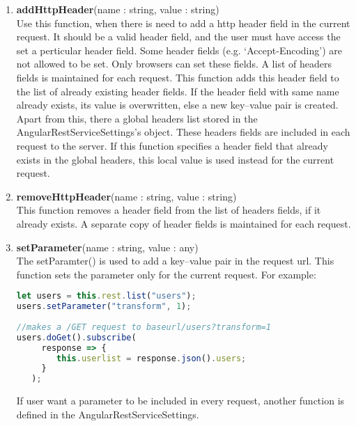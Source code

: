 \begin{enumerate}
{}
\item{ \textbf{addHttpHeader}(name : string, value : string) \\
	Use this function, when there is need to add a http header field in the current request. It should be a valid header field, and the user must have access the set a perticular header field. Some header fields (e.g.  `Accept-Encoding') are not allowed to be set. Only browsers can set these fields. A list of headers fields is maintained for each request. This function adds this header field to the list of already existing header fields. If the header field with same name already exists, its value is overwritten, else a new key--value pair is created. Apart from this, there a global headers list stored in the AngularRestServiceSettings's object. These headers fields are included in each request to the server. If this function specifies a header field that already exists in the global headers, this local value is used instead for the current request.
}
\item{ \textbf{removeHttpHeader}(name : string, value : string) \\
	This function removes a header field from the list of headers fields,  if it already exists. A separate copy of header fields is maintained for each request. 
}
\item{
	\textbf{setParameter}(name : string, value : any) \\
	The setParamter() is used to add a key--value pair in the request url. This function sets the parameter only for the current request. 
	For example:

\begin{lstlisting}[language=Typescript]
let users = this.rest.list("users");
users.setParameter("transform", 1);
    
//makes a /GET request to baseurl/users?transform=1
users.doGet().subscribe(
     response => {
        this.userlist = response.json().users;
     } 
   );
\end{lstlisting}
If user want a parameter to be included in every request, another function is defined in the AngularRestServiceSettings.  

}



\end{enumerate}

	
	
	
	
	
